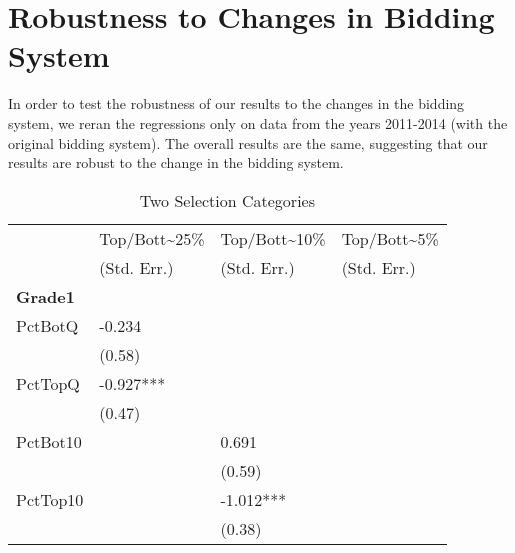 \clearpage{}

\restoregeometry{}

\section{Robustness to Changes in Bidding System}

In order to test the robustness of our results to the changes in the bidding system, we reran the regressions only on data from the years 2011-2014 (with the original bidding system). 
The overall results are the same, suggesting that our results are robust to the change in the bidding system. 
\bigskip
\begin{table}[htb]
  \centering
  \begin{threeparttable}
    \caption{Two Selection Categories}\label{tab:d1}
    \begin{tabular}{l l l l} 
      \hline
      \hline
                      & Top/Bott{\textasciitilde}25\% & Top/Bott{\textasciitilde}10\% & Top/Bott{\textasciitilde}5\% \\
                      & (Std. Err.)                   & (Std. Err.)                   & (Std. Err.)                  \\
      \hline
      \textbf{Grade1} &                               &                               &                              \\
      PctBotQ         & -0.234                        &                               &                              \\
                      & (0.58)                        &                               &                              \\
      PctTopQ         & -0.927***                     &                               &                              \\
                      & (0.47)                        &                               &                              \\
      PctBot10        &                               & 0.691                         &                              \\
                      &                               & (0.59)                        &                              \\
      PctTop10        &                               & -1.012***                     &                              \\
                      &                               & (0.38)                        &                              \\

\end{tabular}
\end{threeparttable}
\end{table}

